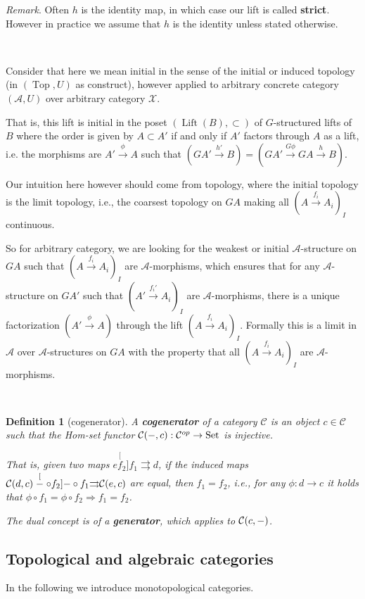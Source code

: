 \documentclass[12pt,a4paper]{article}
\newtheorem{definition}{Definition}[section] %
\DeclareMathOperator{\Set}{Set}
\DeclareMathOperator{\Top}{Top}
\DeclareMathOperator{\Lift}{Lift}
\def\HomC{\ensuremath\mathcal{C}}
\begin{document}
\emph{Remark}. Often $h$ is the identity map, in which case our lift is called \textbf{strict}. However in practice we assume that $h$ is the identity unless stated otherwise.

\

Consider that here we mean initial in the sense of the initial or induced topology (in $(\Top, U)$ as  construct), however applied to arbitrary concrete category $(\mathcal{A}, U)$ over arbitrary category $\mathcal{X}$. 

That is, this lift is initial in the poset $(\Lift(B), \subset)$  of $G$-structured lifts of $B$ where the order is given by $A\subset A'$ if and only if $A'$ factors through $A$ as a lift, i.e. the morphisms are $A' \stackrel{\phi}{\to} A$ such that $(GA' \stackrel{h'}{\to}B) = (GA' \stackrel{G\phi}{\to}GA\stackrel{h}{\to}B) $. 

Our intuition here however should come from topology, where the initial topology is the limit topology, i.e., the coarsest topology on $GA$ making all $(A \stackrel{f_i}{\to}A_i)_I$ continuous. 

So for arbitrary category, we are looking for the weakest or initial $\mathcal{A}$-structure on $GA$ such that $(A \stackrel{f_i}{\to}A_i)_I$ are $\mathcal{A}$-morphisms, which ensures that for any $\mathcal{A}$-structure on $GA'$ such that $(A' \stackrel{f_i'}{\to}A_i)_I$ are $\mathcal{A}$-morphisms, there is a unique factorization $(A' \stackrel{\phi}{\to}A)$ through the lift $(A\stackrel{f_i}{\to} A_i)_I$. 
Formally this is a limit  in $\mathcal{A}$ over $\mathcal{A}$-structures on $GA$ with the property that all $(A \stackrel{f_i}{\to}A_i)_I$ are $\mathcal{A}$-morphisms.

\

\begin{definition}[cogenerator]
A \textbf{cogenerator} of a category $\mathcal{C}$ is an object $c \in \mathcal{C}$ such that the Hom-set functor $\HomC(-, c): \mathcal{C}^{op} \to \Set$ is injective.

That is, given two maps $e \stackrel[f_2]{f_1}{\rightrightarrows} d$, if the induced maps $\HomC(d, c) \stackrel[- \circ f_2]{- \circ f_1}{\rightrightarrows}  \HomC(e,c)$ are equal, then $f_1 = f_2$, i.e., for any $\phi: d \to c$ it holds that $\phi \circ f_1 = \phi \circ f_2 \Rightarrow f_1 = f_2$. 

The dual concept is of a \textbf{generator}, which applies to $\HomC(c, -)$.
\end{definition}
\subsection{Topological and algebraic categories}
In the following we  introduce monotopological categories. 
\end{document}
